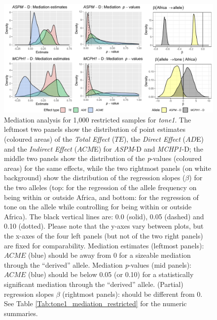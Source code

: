 \documentclass[twoside,twocolumn]{article}
\begin{document}
\begin{figure}[h]
  \centering
  \includegraphics[width=\textwidth]{../../code/figures/tone1_mediation_restricted}
  \caption{Mediation analysis for 1,000 restricted samples for \textit{tone1}. The leftmost two panels show the distribution of point estimates (coloured areas) of the \textit{Total Effect} ($TE$), the \textit{Direct Effect} ($AD$E) and the \textit{Indirect Effect} ($ACM$E) for \textit{ASPM}-D and \textit{MCHP1}-D; the middle two panels show the distribution of the \textit{p}-values (coloured areas) for the same effects, while the two rightmost panels (on white background) show the distribution of the regression slopes ($\beta$) for the two alleles (top: for the regression of the allele frequency on being within or outside Africa, and bottom: for the regression of tone on the allele while controlling for being within or outside Africa). The black vertical lines are: 0.0 (solid), 0.05 (dashed) and 0.10 (dotted). Please note that the y-axes vary between plots, but the x-axes of the four left panels (but not of the two right panels) are fixed for comparability. Mediation estimates (leftmost panels): $ACME$ (blue) should be away from 0 for a sizeable mediation through the ``derived'' allele. Mediation \textit{p}-values (mid panels): $ACME$ (blue) should be below 0.05 (or 0.10) for a statistically significant mediation through the ``derived'' allele. (Partial) regression slopes $\beta$ (rightmost panels): should be different from 0. See Table \ref{Tab:tone1_mediation_restricted} for the numeric summaries.}
  \label{Fig:tone1_mediation_restricted}
\end{figure}
\end{document}
